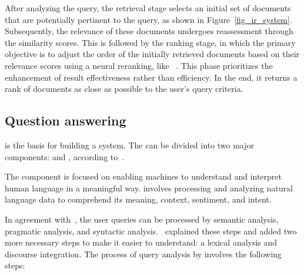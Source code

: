 After analyzing the query, the retrieval stage selects an initial set of documents that are potentially pertinent to the query, as shown in Figure~\ref{fig_ir_system}. Subsequently, the relevance of these documents undergoes reassessment through the similarity scores. This is followed by the ranking stage, in which the primary objective is to adjust the order of the initially retrieved documents based on their relevance scores using a neural reranking, like {\bert}~\cite{chen_integrating_2023}. This phase prioritizes the enhancement of result effectiveness rather than efficiency. In the end, it returns a rank of documents as close as possible to the user's query criteria. 


\subsection{Question answering}

{\nlp} is the basis for building a {\qa} system. The {\nlp} can be divided into two major components: {\nlu} and {\nlg}, according to~\citet{ayanouz_smart_2020}.

The {\nlu} component is focused on enabling machines to understand and interpret human language in a meaningful way. {\nlu} involves processing and analyzing natural language data to comprehend its meaning, context, sentiment, and intent. 

In agreement with~\citet{ngai_intelligent_2021}, the user queries can be processed by semantic analysis, pragmatic analysis, and syntactic analysis.~\citet{ayanouz_smart_2020} explained these steps and added two more necessary steps to make it easier to understand: a lexical analysis and discourse integration. The process of query analysis by {\nlu} involves the following steps:


